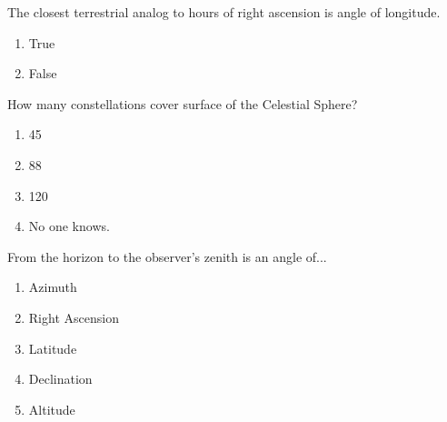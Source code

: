 \documentclass[11pt]{article}
\begin{document}
\begin{enumerate}
\begin{minipage}{\textwidth}
\begin{minipage}{\textwidth}
\item The closest terrestrial analog to hours of right ascension is angle of longitude.
\begin{multicols}{3}
\begin{enumerate} 
\setlength{\itemsep}{1pt} 
\setlength{\parskip}{0pt} 
\setlength{\parsep}{0pt}
\setlength{\multicolsep}{1pt} 
\item True
\item False
\end{enumerate} 
\vfill 
\end{multicols}

\end{minipage}
\end{minipage}
\vskip 0.20in

\begin{minipage}{\textwidth}
\begin{minipage}{\textwidth}
\item How many constellations cover surface of the Celestial Sphere?
\begin{multicols}{3}
\begin{enumerate} 
\setlength{\itemsep}{1pt} 
\setlength{\parskip}{0pt} 
\setlength{\parsep}{0pt}
\setlength{\multicolsep}{1pt} 
\item 45
\item 88
\item 120
\item No one knows.
\end{enumerate} 
\vfill 
\end{multicols}

\end{minipage}
\end{minipage}
\vskip 0.20in

\begin{minipage}{\textwidth}
\begin{minipage}{\textwidth}
\item From the horizon to the observer's zenith is an angle of...
\begin{multicols}{3}
\begin{enumerate} 
\setlength{\itemsep}{1pt} 
\setlength{\parskip}{0pt} 
\setlength{\parsep}{0pt}
\setlength{\multicolsep}{1pt} 
\item Azimuth
\item Right Ascension
\item Latitude
\item Declination
\item Altitude
\end{enumerate} 
\vfill 
\end{multicols}

\end{minipage}
\end{minipage}
\vskip 0.20in

\end{enumerate}
\end{document}
